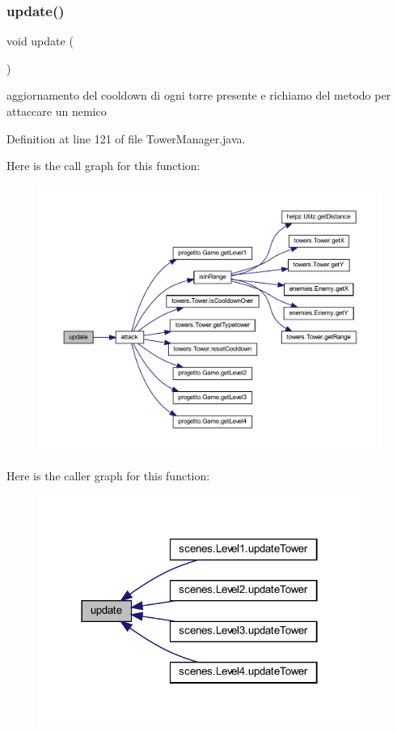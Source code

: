 \subsubsection{\texorpdfstring{update()}{update()}}
{\footnotesize\ttfamily void update (\begin{DoxyParamCaption}{ }\end{DoxyParamCaption})}



aggiornamento del cooldown di ogni torre presente e richiamo del metodo per attaccare un nemico 



Definition at line 121 of file Tower\+Manager.\+java.

Here is the call graph for this function\+:
\nopagebreak
\begin{figure}[H]
\begin{center}
\leavevmode
\includegraphics[width=350pt]{classmanagers_1_1_tower_manager_ac5c54df7ed3b930268c8d7752c101725_cgraph}
\end{center}
\end{figure}
Here is the caller graph for this function\+:\nopagebreak
\begin{figure}[H]
\begin{center}
\leavevmode
\includegraphics[width=298pt]{classmanagers_1_1_tower_manager_ac5c54df7ed3b930268c8d7752c101725_icgraph}
\end{center}
\end{figure}
